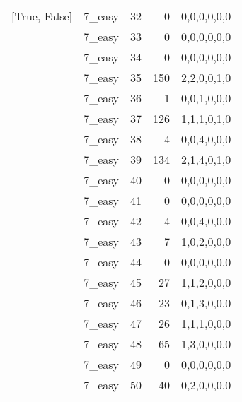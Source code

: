 \begin{tabular}{llrrl}
 [True, False]   & 7\_easy              &            32 &                     0 & 0,0,0,0,0,0   \\
 [True, False]   & 7\_easy              &            33 &                     0 & 0,0,0,0,0,0   \\
 [True, False]   & 7\_easy              &            34 &                     0 & 0,0,0,0,0,0   \\
 [True, False]   & 7\_easy              &            35 &                   150 & 2,2,0,0,1,0   \\
 [True, False]   & 7\_easy              &            36 &                     1 & 0,0,1,0,0,0   \\
 [True, False]   & 7\_easy              &            37 &                   126 & 1,1,1,0,1,0   \\
 [True, False]   & 7\_easy              &            38 &                     4 & 0,0,4,0,0,0   \\
 [True, False]   & 7\_easy              &            39 &                   134 & 2,1,4,0,1,0   \\
 [True, False]   & 7\_easy              &            40 &                     0 & 0,0,0,0,0,0   \\
 [True, False]   & 7\_easy              &            41 &                     0 & 0,0,0,0,0,0   \\
 [True, False]   & 7\_easy              &            42 &                     4 & 0,0,4,0,0,0   \\
 [True, False]   & 7\_easy              &            43 &                     7 & 1,0,2,0,0,0   \\
 [True, False]   & 7\_easy              &            44 &                     0 & 0,0,0,0,0,0   \\
 [True, False]   & 7\_easy              &            45 &                    27 & 1,1,2,0,0,0   \\
 [True, False]   & 7\_easy              &            46 &                    23 & 0,1,3,0,0,0   \\
 [True, False]   & 7\_easy              &            47 &                    26 & 1,1,1,0,0,0   \\
 [True, False]   & 7\_easy              &            48 &                    65 & 1,3,0,0,0,0   \\
 [True, False]   & 7\_easy              &            49 &                     0 & 0,0,0,0,0,0   \\
 [True, False]   & 7\_easy              &            50 &                    40 & 0,2,0,0,0,0   \\

\end{tabular}
